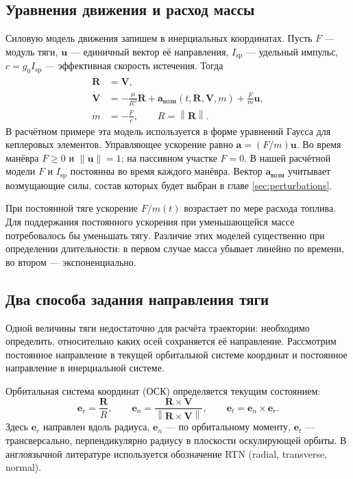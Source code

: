 \documentclass[a4paper,11pt]{article}
\newcommand{\vect}[1]{\boldsymbol{#1}}
\newcommand{\norm}[1]{\left\lVert#1\right\rVert}
\numberwithin{equation}{section}
\begin{document}
\subsection{Уравнения движения и расход массы}

Силовую модель движения запишем в инерциальных координатах.
Пусть $F$ --- модуль тяги, $\vect u$ --- единичный вектор её направления,
$I_{\mathrm{sp}}$ --- удельный импульс, $c=g_0I_{\mathrm{sp}}$ ---
эффективная скорость истечения. Тогда
\begin{equation}
\begin{aligned}
\dot{\vect R}&=\vect V,\\
\dot{\vect V}&=-\frac{\mu}{R^3}\vect R
             +\vect a_{\text{возм}}(t,\vect R,\vect V,m)
             +\frac{F}{m}\vect u,\\
\dot m&=-\frac{F}{c},\qquad R=\norm{\vect R}.
\end{aligned}
\label{eq:motion}
\end{equation}
В расчётном примере эта модель используется в форме уравнений
Гаусса для кеплеровых элементов.
Управляющее ускорение равно $\vect a=(F/m)\vect u$.
Во время манёвра $F\geqslant0$ и $\norm{\vect u}=1$;
на пассивном участке $F=0$.
В нашей расчётной модели $F$ и $I_{\mathrm{sp}}$ постоянны
во время каждого манёвра. Вектор $\vect a_{\text{возм}}$ учитывает
возмущающие силы, состав которых будет выбран в главе
\ref{sec:perturbations}.

При постоянной тяге ускорение $F/m(t)$ возрастает по мере расхода
топлива. Для поддержания постоянного ускорения при уменьшающейся
массе потребовалось бы уменьшать тягу. Различие этих моделей
существенно при определении длительности: в первом случае
масса убывает линейно по времени, во втором --- экспоненциально.

\subsection{Два способа задания направления тяги}

Одной величины тяги недостаточно для расчёта траектории:
необходимо определить, относительно каких осей сохраняется её
направление. Рассмотрим постоянное направление в текущей орбитальной
системе координат и постоянное направление в инерциальной системе.

Орбитальная система координат (ОСК) определяется текущим состоянием:
\begin{equation}
\vect e_r=\frac{\vect R}{R},\qquad
\vect e_n=\frac{\vect R\times\vect V}{\norm{\vect R\times\vect V}},
\qquad \vect e_t=\vect e_n\times\vect e_r.
\label{eq:rtn}
\end{equation}
Здесь $\vect e_r$ направлен вдоль радиуса, $\vect e_n$ ---
по орбитальному моменту, $\vect e_t$ --- трансверсально,
перпендикулярно радиусу в плоскости оскулирующей орбиты.
В англоязычной литературе используется обозначение RTN
(radial, transverse, normal).
\end{document}
